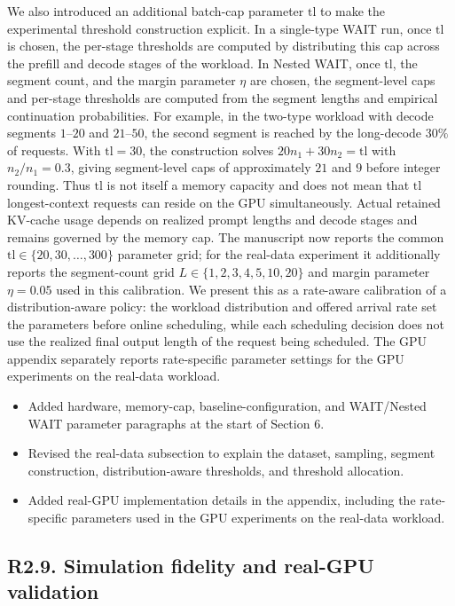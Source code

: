 We also introduced an additional batch-cap parameter \(\mathrm{tl}\) to make the experimental threshold construction explicit. In a single-type WAIT run, once \(\mathrm{tl}\) is chosen, the per-stage thresholds are computed by distributing this cap across the prefill and decode stages of the workload. In Nested WAIT, once \(\mathrm{tl}\), the segment count, and the margin parameter \(\eta\) are chosen, the segment-level caps and per-stage thresholds are computed from the segment lengths and empirical continuation probabilities. For example, in the two-type workload with decode segments \(1\)--\(20\) and \(21\)--\(50\), the second segment is reached by the long-decode \(30\%\) of requests. With \(\mathrm{tl}=30\), the construction solves \(20n_1+30n_2=\mathrm{tl}\) with \(n_2/n_1=0.3\), giving segment-level caps of approximately \(21\) and \(9\) before integer rounding. Thus \(\mathrm{tl}\) is not itself a memory capacity and does not mean that \(\mathrm{tl}\) longest-context requests can reside on the GPU simultaneously. Actual retained KV-cache usage depends on realized prompt lengths and decode stages and remains governed by the memory cap. The manuscript now reports the common \(\mathrm{tl}\in\{20,30,\ldots,300\}\) parameter grid; for the real-data experiment it additionally reports the segment-count grid \(L\in\{1,2,3,4,5,10,20\}\) and margin parameter \(\eta=0.05\) used in this calibration. We present this as a rate-aware calibration of a distribution-aware policy: the workload distribution and offered arrival rate set the parameters before online scheduling, while each scheduling decision does not use the realized final output length of the request being scheduled. The GPU appendix separately reports rate-specific parameter settings for the GPU experiments on the real-data workload.

\changes
\begin{itemize}
    \item Added hardware, memory-cap, baseline-configuration, and WAIT/Nested WAIT parameter paragraphs at the start of Section 6.
    \item Revised the real-data subsection to explain the dataset, sampling, segment construction, distribution-aware thresholds, and threshold allocation.
    \item Added real-GPU implementation details in the appendix, including the rate-specific parameters used in the GPU experiments on the real-data workload.
\end{itemize}

\subsection*{R2.9. Simulation fidelity and real-GPU validation}

